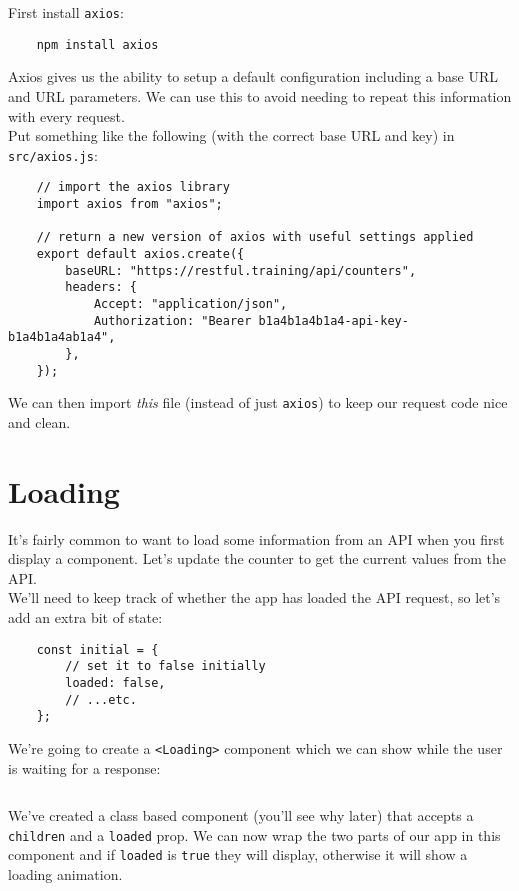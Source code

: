 First install \texttt{axios}:

\begin{verbatim}
    npm install axios
\end{verbatim}

Axios gives us the ability to setup a default configuration including a base URL and URL parameters. We can use this to avoid needing to repeat this information with every request.
\\

Put something like the following (with the correct base URL and key) in \texttt{src/axios.js}:

\begin{verbatim}
    // import the axios library
    import axios from "axios";

    // return a new version of axios with useful settings applied
    export default axios.create({
        baseURL: "https://restful.training/api/counters",
        headers: {
            Accept: "application/json",
            Authorization: "Bearer b1a4b1a4b1a4-api-key-b1a4b1a4ab1a4",
        },
    });
\end{verbatim}

We can then import \textit{this} file (instead of just \texttt{axios}) to keep our request code nice and clean.


\section{Loading}

It's fairly common to want to load some information from an API when you first display a component. Let's update the counter to get the current values from the API.
\\

We'll need to keep track of whether the app has loaded the API request, so let's add an extra bit of state:

\begin{verbatim}
    const initial = {
        // set it to false initially
        loaded: false,
        // ...etc.
    };
\end{verbatim}


We're going to create a \texttt{<Loading>} component which we can show while the user is waiting for a response:

\inputminted{jsx}{04/figures/01-Loading.jsx}

We've created a class based component (you'll see why later) that accepts a \texttt{children} and a \texttt{loaded} prop. We can now wrap the two parts of our app in this component and if \texttt{loaded} is \texttt{true} they will display, otherwise it will show a loading animation.
\\

